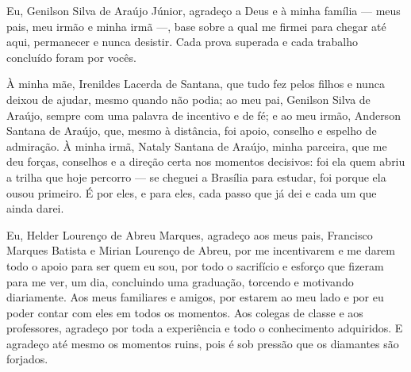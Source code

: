 \begin{agradecimentos}
Eu, Genilson Silva de Araújo Júnior, agradeço a Deus e à minha família --- meus pais, meu
irmão e minha irmã ---, base sobre a qual me firmei para chegar até aqui, permanecer e nunca
desistir. Cada prova superada e cada trabalho concluído foram por vocês.

À minha mãe, Irenildes Lacerda de Santana, que tudo fez pelos filhos e nunca deixou de
ajudar, mesmo quando não podia; ao meu pai, Genilson Silva de Araújo, sempre com uma palavra
de incentivo e de fé; e ao meu irmão, Anderson Santana de Araújo, que, mesmo à distância, foi
apoio, conselho e espelho de admiração. À minha irmã, Nataly Santana de Araújo, minha
parceira, que me deu forças, conselhos e a direção certa nos momentos decisivos: foi ela quem
abriu a trilha que hoje percorro --- se cheguei a Brasília para estudar, foi porque ela ousou
primeiro. É por eles, e para eles, cada passo que já dei e cada um que ainda darei.

\vspace{\onelineskip}

Eu, Helder Lourenço de Abreu Marques, agradeço aos meus pais, Francisco Marques Batista e
Mirian Lourenço de Abreu, por me incentivarem e me darem todo o apoio para ser quem eu sou,
por todo o sacrifício e esforço que fizeram para me ver, um dia, concluindo uma graduação,
torcendo e motivando diariamente. Aos meus familiares e amigos, por estarem ao meu lado e por
eu poder contar com eles em todos os momentos. Aos colegas de classe e aos professores,
agradeço por toda a experiência e todo o conhecimento adquiridos. E agradeço até mesmo os
momentos ruins, pois é sob pressão que os diamantes são forjados.
\end{agradecimentos}
